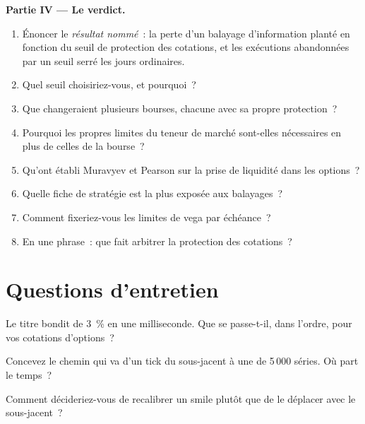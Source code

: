 \begin{problem}
\medskip\noindent\textbf{Partie IV --- Le verdict.}
\begin{enumerate}[resume]
\item Énoncer le \emph{résultat nommé}~: la perte d'un balayage d'information planté en fonction du seuil de protection des cotations, et les exécutions abandonnées par
un seuil serré les jours ordinaires.
\item Quel seuil choisiriez-vous, et pourquoi~?
\item Que changeraient plusieurs bourses, chacune avec sa propre protection~?
\item Pourquoi les propres limites du teneur de marché sont-elles nécessaires en plus de celles de la bourse~?
\item Qu'ont établi Muravyev et Pearson sur la prise de liquidité dans les options~?
\item Quelle fiche de stratégie est la plus exposée aux balayages~?
\item Comment fixeriez-vous les limites de vega par échéance~?
\item En une phrase~: que fait arbitrer la protection des cotations~?
\end{enumerate}
\end{problem}

\section{Questions d'entretien}

\begin{interviewq}\label{iq:hf:automated-options-market-making:1}
Le titre bondit de 3~\% en une milliseconde. Que se passe-t-il, dans l'ordre, pour vos cotations d'options~?
\end{interviewq}

\begin{interviewq}\label{iq:hf:automated-options-market-making:2}
Concevez le chemin qui va d'un tick du sous-jacent à une  de 5\,000 séries. Où part le temps~?
\end{interviewq}

\begin{interviewq}\label{iq:hf:automated-options-market-making:3}
Comment décideriez-vous de recalibrer un smile plutôt que de le déplacer avec le sous-jacent~?
\end{interviewq}

